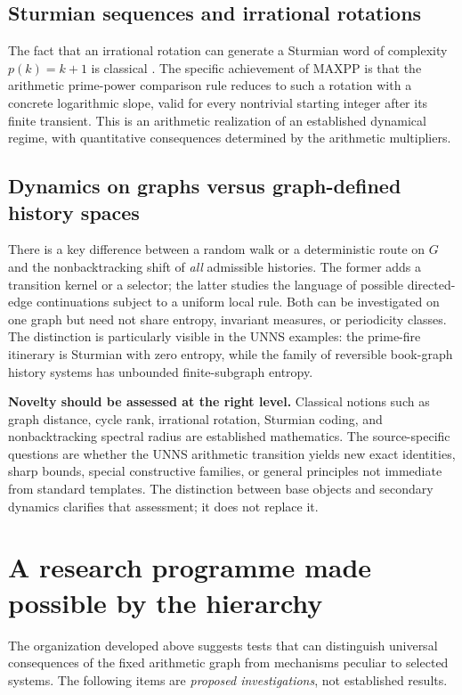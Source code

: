 \documentclass[11pt,a4paper]{article}
\theoremstyle{definition}\newtheorem{definition}[theorem]{Definition}
\begin{document}
\subsection{Sturmian sequences and irrational rotations}
The fact that an irrational rotation can generate a Sturmian word of complexity $p(k)=k+1$ is classical \cite{morse,sturmian}. The specific achievement of MAXPP is that the arithmetic prime-power comparison rule reduces to such a rotation with a concrete logarithmic slope, valid for every nontrivial starting integer after its finite transient. This is an arithmetic realization of an established dynamical regime, with quantitative consequences determined by the arithmetic multipliers.

\subsection{Dynamics on graphs versus graph-defined history spaces}
There is a key difference between a random walk or a deterministic route on $G$ and the nonbacktracking shift of \emph{all} admissible histories. The former adds a transition kernel or a selector; the latter studies the language of possible directed-edge continuations subject to a uniform local rule. Both can be investigated on one graph but need not share entropy, invariant measures, or periodicity classes. The distinction is particularly visible in the UNNS examples: the prime-fire itinerary is Sturmian with zero entropy, while the family of reversible book-graph history systems has unbounded finite-subgraph entropy.

\begin{scopebox}
\textbf{Novelty should be assessed at the right level.} Classical notions such as graph distance, cycle rank, irrational rotation, Sturmian coding, and nonbacktracking spectral radius are established mathematics. The source-specific questions are whether the UNNS arithmetic transition yields new exact identities, sharp bounds, special constructive families, or general principles not immediate from standard templates. The distinction between base objects and secondary dynamics clarifies that assessment; it does not replace it.
\end{scopebox}

\section{A research programme made possible by the hierarchy}
\label{sec:agenda}
The organization developed above suggests tests that can distinguish universal consequences of the fixed arithmetic graph from mechanisms peculiar to selected systems. The following items are \emph{proposed investigations}, not established results.
\end{document}
